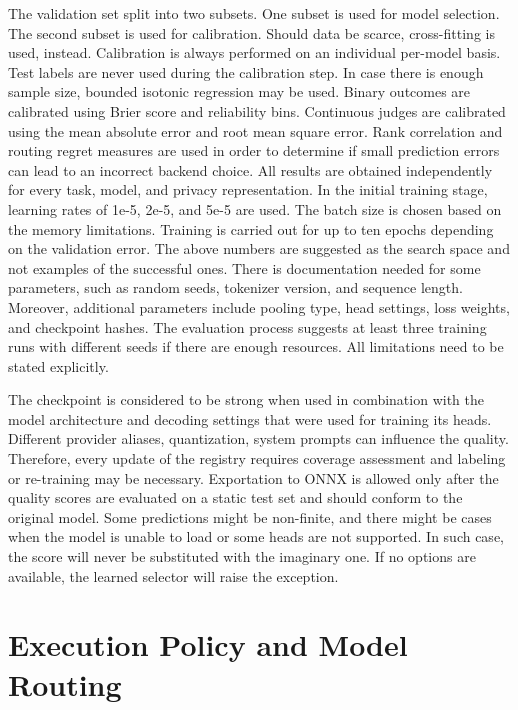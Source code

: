 \documentclass{FastFyp}
\begin{document}
The validation set split into two subsets.
One subset is used for model selection.
The second subset is used for calibration.
Should data be scarce, cross-fitting is used, instead.
Calibration is always performed on an individual per-model basis.
Test labels are never used during the calibration step.
In case there is enough sample size, bounded isotonic regression may be used.
Binary outcomes are calibrated using Brier score and reliability bins.
Continuous judges are calibrated using the mean absolute error and root mean square error.
Rank correlation and routing regret measures are used in order to determine if small prediction errors can lead to an incorrect backend choice. All results are obtained independently for every task, model, and privacy representation.
In the initial training stage, learning rates of 1e-5, 2e-5, and 5e-5 are used. The batch size is chosen based on the memory limitations. Training is carried out for up to ten epochs depending on the validation error. The above numbers are suggested as the search space and not examples of the successful ones. There is documentation needed for some parameters, such as random seeds, tokenizer version, and sequence length. Moreover, additional parameters include pooling type, head settings, loss weights, and checkpoint hashes. The evaluation process suggests at least three training runs with different seeds if there are enough resources. All limitations need to be stated explicitly.

The checkpoint is considered to be strong when used in combination with the model architecture and decoding settings that were used for training its heads. Different provider aliases, quantization, system prompts can influence the quality. Therefore, every update of the registry requires coverage assessment and labeling or re-training may be necessary. Exportation to ONNX is allowed only after the quality scores are evaluated on a static test set and should conform to the original model. Some predictions might be non-finite, and there might be cases when the model is unable to load or some heads are not supported. In such case, the score will never be substituted with the imaginary one. If no options are available, the learned selector will raise the exception.

\section{Execution Policy and Model Routing}
\label{sec:stage4-policy}
\end{document}
